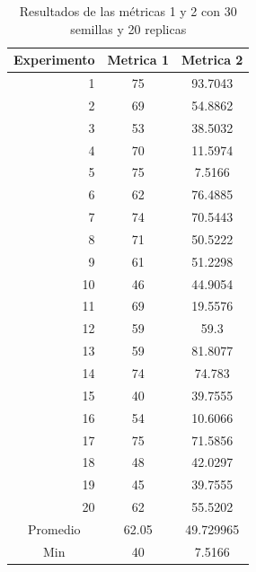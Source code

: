 \documentclass{article}
\begin{document}
\begin{center}
\begin{table}[htbp]
	\centering
	\caption{Resultados  de las métricas 1 y 2 con 30 semillas  y 20 replicas}
	\begin{tabular}{|c|c|c|}
		\hline
		Experimento  & \multicolumn{1}{l|}{Metrica 1} & \multicolumn{1}{l|}{Metrica 2} \\
		\hline
		\multicolumn{1}{|r|}{1} & 75    & 93.7043 \\
		\hline
		\multicolumn{1}{|r|}{2} & 69    & 54.8862 \\
		\hline
		\multicolumn{1}{|r|}{3} & 53    & 38.5032 \\
		\hline
		\multicolumn{1}{|r|}{4} & 70    & 11.5974 \\
		\hline
		\multicolumn{1}{|r|}{5} & 75    & \cellcolor[rgb]{ .663,  .816,  .557}7.5166 \\
		\hline
		\multicolumn{1}{|r|}{6} & 62    & 76.4885 \\
		\hline
		\multicolumn{1}{|r|}{7} & 74    & 70.5443 \\
		\hline
		\multicolumn{1}{|r|}{8} & 71    & 50.5222 \\
		\hline
		\multicolumn{1}{|r|}{9} & 61    & 51.2298 \\
		\hline
		\multicolumn{1}{|r|}{10} & 46    & 44.9054 \\
		\hline
		\multicolumn{1}{|r|}{11} & 69    & 19.5576 \\
		\hline
		\multicolumn{1}{|r|}{12} & 59    & 59.3 \\
		\hline
		\multicolumn{1}{|r|}{13} & 59    & 81.8077 \\
		\hline
		\multicolumn{1}{|r|}{14} & 74    & 74.783 \\
		\hline
		\multicolumn{1}{|r|}{15} & \cellcolor[rgb]{ .663,  .816,  .557}40 & 39.7555 \\
		\hline
		\multicolumn{1}{|r|}{16} & 54    & 10.6066 \\
		\hline
		\multicolumn{1}{|r|}{17} & 75    & 71.5856 \\
		\hline
		\multicolumn{1}{|r|}{18} & 48    & 42.0297 \\
		\hline
		\multicolumn{1}{|r|}{19} & 45    & 39.7555 \\
		\hline
		\multicolumn{1}{|r|}{20} & 62    & 55.5202 \\
		\hline
		Promedio & 62.05 & 49.729965 \\
		\hline
		Min   & 40    & 7.5166 \\
		\hline
	\end{tabular}%
	\label{tab:addlabel}%
\end{table}%



\end{center}
\end{document}

